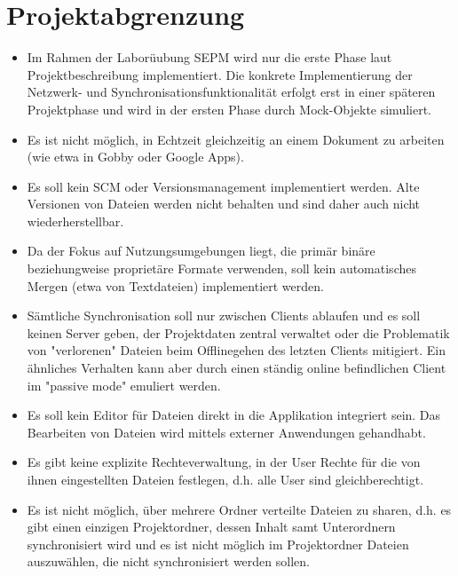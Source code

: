 
\section{Projektabgrenzung}
\begin{itemize}
  \item Im Rahmen der Laborüubung SEPM wird nur die erste Phase laut Projektbeschreibung implementiert. Die konkrete Implementierung der Netzwerk- und Synchronisationsfunktionalität erfolgt erst in einer späteren Projektphase und wird in der ersten Phase durch Mock-Objekte simuliert.
  \item Es ist nicht möglich, in Echtzeit gleichzeitig an einem Dokument zu arbeiten (wie etwa in Gobby oder Google Apps).
  \item Es soll kein SCM oder Versionsmanagement implementiert werden. Alte Versionen von Dateien werden nicht behalten und sind daher auch nicht wiederherstellbar.
  \item Da der Fokus auf Nutzungsumgebungen liegt, die primär binäre beziehungweise proprietäre Formate verwenden, soll kein automatisches Mergen (etwa von Textdateien) implementiert werden.
  \item Sämtliche Synchronisation soll nur zwischen Clients ablaufen und es soll keinen Server geben, der Projektdaten zentral verwaltet oder die Problematik von "verlorenen" Dateien beim Offlinegehen des letzten Clients mitigiert. Ein ähnliches Verhalten kann aber durch einen ständig online befindlichen Client im "passive mode" emuliert werden.
  \item Es soll kein Editor für Dateien direkt in die Applikation integriert sein. Das Bearbeiten von Dateien wird mittels externer Anwendungen gehandhabt.
  \item Es gibt keine explizite Rechteverwaltung, in der User Rechte für die von ihnen eingestellten Dateien festlegen, d.h. alle User sind gleichberechtigt.
  \item Es ist nicht möglich, über mehrere Ordner verteilte Dateien zu sharen, d.h. es gibt einen einzigen Projektordner, dessen Inhalt samt Unterordnern synchronisiert wird und es ist nicht möglich im Projektordner Dateien auszuwählen, die nicht synchronisiert werden sollen.
\end{itemize}